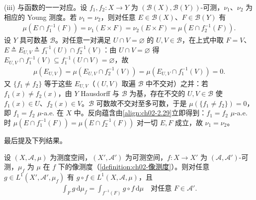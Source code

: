 \documentclass[../../main.tex]{subfiles}%
\begin{document}
\begin{remark}
(iii) 与函数的一一对应。设 $f_1,f_2:X\to Y$ 为 $(\mathscr B(X),\mathscr B(Y))$-可测，$\nu_1$、$\nu_2$ 为相应的 Young 测度。若 $\nu_1=\nu_2$，则对任意 $E\in\mathscr B(X)$、$F\in\mathscr B(Y)$ 有
\begin{align*}
\mu(E\cap f_1^{-1}(F))=\nu_1(E\times F)=\nu_2(E\times F)=\mu(E\cap f_2^{-1}(F)).
\end{align*}
设 $Y$ 具可数基 $\mathcal B$。对任意一对满足 $U\cap V=\varnothing$ 的 $U,V\in\mathcal B$，在上式中取 $F=V$、$E\triangleq E_{U,V}\triangleq f_1^{-1}(U)\cap f_2^{-1}(V)$：由 $U\cap V=\varnothing$ 得 $E_{U,V}\cap f_1^{-1}(V)\subseteq f_1^{-1}(U\cap V)=\varnothing$，故
\begin{align*}
\mu(E_{U,V})=\mu(E_{U,V}\cap f_2^{-1}(V))=\mu(E_{U,V}\cap f_1^{-1}(V))=0.
\end{align*}
又 $\{f_1\neq f_2\}$ 等于这些 $E_{U,V}$（$(U,V)$ 取遍 $\mathcal B$ 中不交对）之并：若 $f_1(x)\neq f_2(x)$，由 $Y$ Hausdorff 与 $\mathcal B$ 为基，存在不交的 $U,V\in\mathcal B$ 使 $f_1(x)\in U$、$f_2(x)\in V$。$\mathcal B$ 可数故不交对至多可数，于是 $\mu(\{f_1\neq f_2\})=0$，即 $f_1=f_2$ $\mu$-a.e. 在 $X$ 中。反向蕴含由\eqref{align:ch02-2.29}立即得到：$f_1=f_2$ $\mu$-a.e. 时 $\mu(E\cap f_1^{-1}(F))=\mu(E\cap f_2^{-1}(F))$ 对一切 $E,F$ 成立，故 $\nu_1=\nu_2$。
\end{remark}

最后提及下列结果。

\begin{lemma}\label{lemma:ch02-像测度积分}\label{lemma:ch02-像测度}
设 $(X,\mathscr A,\mu)$ 为测度空间，$(X',\mathscr A')$ 为可测空间，$f:X\to X'$ 为 $(\mathscr A,\mathscr A')$-可测，$\mu_f$ 为 $\mu$ 在 $f$ 下的像测度（\cref{definition:ch02-像测度}）。则对任意 $g\in L^1(X',\mathscr A',\mu_f)$ 有 $g\circ f\in L^1(X,\mathscr A,\mu)$，且
\begin{align}
\int_F g\,\mathrm{d}\mu_f=\int_{f^{-1}(F)}g\circ f\,\mathrm{d}\mu\quad\text{对任意 }F\in\mathscr A'. \label{align:ch02-2.30}
\end{align}
\end{lemma}
\end{document}
